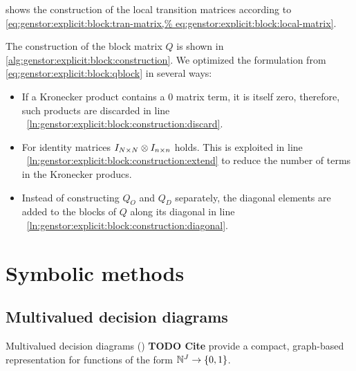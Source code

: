  shows the construction of
the local transition matrices according to
\cref{eq:genstor:explicit:block:tran-matrix,%
eq:genstor:explicit:block:local-matrix}.

The construction of the block matrix $Q$ is shown in
\vref{alg:genstor:explicit:block:construction}. We optimized the formulation from
\cref{eq:genstor:explicit:block:qblock} in several ways:
\begin{itemize}
\item If a Kronecker product contains a $0$ matrix term, it is itself
  zero, therefore, such products are discarded in line%
  ~\ref{ln:genstor:explicit:block:construction:discard}.
\item For identity matrices $I_{N \times N} \otimes I_{n \times n}$
  holds. This is exploited in line%
  ~\ref{ln:genstor:explicit:block:construction:extend} to reduce the
  number of terms in the Kronecker producs.
\item Instead of constructing $Q_O$ and $Q_D$ separately, the diagonal
  elements are added to the blocks of $Q$ along its diagonal in line%
  ~\ref{ln:genstor:explicit:block:construction:diagonal}.
\end{itemize}

\section{Symbolic methods}

\subsection{Multivalued decision diagrams}

Multivalued decision diagrams () \textbf{TODO Cite}
provide a compact, graph-based representation for functions of the
form $\mathbb{N}^J \to \{0, 1\}$.

